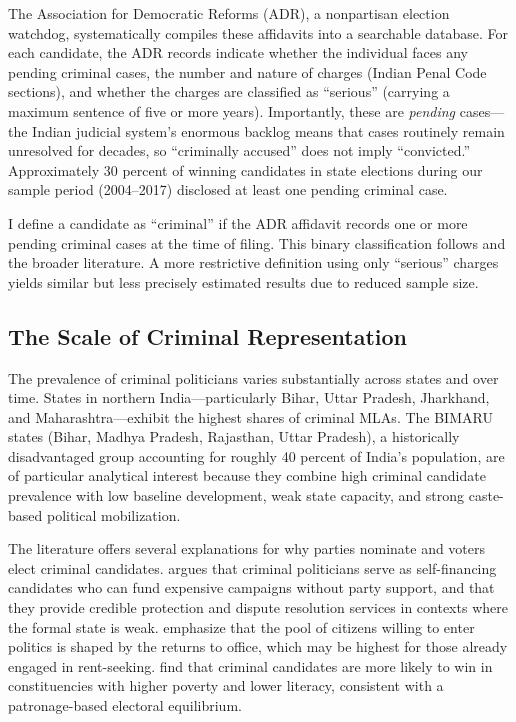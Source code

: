 \documentclass[12pt]{article}
\begin{document}
The Association for Democratic Reforms (ADR), a nonpartisan election watchdog, systematically compiles these affidavits into a searchable database. For each candidate, the ADR records indicate whether the individual faces any pending criminal cases, the number and nature of charges (Indian Penal Code sections), and whether the charges are classified as ``serious'' (carrying a maximum sentence of five or more years). Importantly, these are \textit{pending} cases---the Indian judicial system's enormous backlog means that cases routinely remain unresolved for decades, so ``criminally accused'' does not imply ``convicted.'' Approximately 30 percent of winning candidates in state elections during our sample period (2004--2017) disclosed at least one pending criminal case.

I define a candidate as ``criminal'' if the ADR affidavit records one or more pending criminal cases at the time of filing. This binary classification follows \citet{prakash2019} and the broader literature. A more restrictive definition using only ``serious'' charges yields similar but less precisely estimated results due to reduced sample size.

\subsection{The Scale of Criminal Representation}

The prevalence of criminal politicians varies substantially across states and over time. States in northern India---particularly Bihar, Uttar Pradesh, Jharkhand, and Maharashtra---exhibit the highest shares of criminal MLAs. The BIMARU states (Bihar, Madhya Pradesh, Rajasthan, Uttar Pradesh), a historically disadvantaged group accounting for roughly 40 percent of India's population, are of particular analytical interest because they combine high criminal candidate prevalence with low baseline development, weak state capacity, and strong caste-based political mobilization.

The literature offers several explanations for why parties nominate and voters elect criminal candidates. \citet{vaishnav2017} argues that criminal politicians serve as self-financing candidates who can fund expensive campaigns without party support, and that they provide credible protection and dispute resolution services in contexts where the formal state is weak. \citet{banerjee2007} emphasize that the pool of citizens willing to enter politics is shaped by the returns to office, which may be highest for those already engaged in rent-seeking. \citet{dutta2012} find that criminal candidates are more likely to win in constituencies with higher poverty and lower literacy, consistent with a patronage-based electoral equilibrium.
\end{document}
